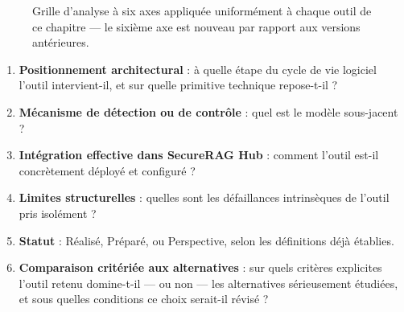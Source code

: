 \begin{figure}[htbp]
    \centering
    \scriptsize
\caption{Grille d'analyse à six axes appliquée uniformément à chaque outil de ce chapitre — le sixième axe est nouveau par rapport aux versions antérieures.}
\label{fig:grille_analyse}
\end{figure}

\begin{enumerate}
    \item \textbf{Positionnement architectural} : à quelle étape du cycle de vie logiciel l'outil intervient-il, et sur quelle primitive technique repose-t-il ?
    \item \textbf{Mécanisme de détection ou de contrôle} : quel est le modèle sous-jacent ?
    \item \textbf{Intégration effective dans SecureRAG Hub} : comment l'outil est-il concrètement déployé et configuré ?
    \item \textbf{Limites structurelles} : quelles sont les défaillances intrinsèques de l'outil pris isolément ?
    \item \textbf{Statut} : Réalisé, Préparé, ou Perspective, selon les définitions déjà établies.
    \item \textbf{Comparaison critériée aux alternatives} : sur quels critères explicites l'outil retenu domine-t-il — ou non — les alternatives sérieusement étudiées, et sous quelles conditions ce choix serait-il révisé ?
\end{enumerate}

